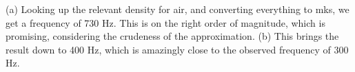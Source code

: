 (a) Looking up the relevant density for air, and converting everything to mks,
we get a frequency of 730 Hz. This is on the right order of magnitude, which
is promising, considering the crudeness of the approximation.
(b) This brings the result down to 400 Hz, which is amazingly close to the
observed frequency of 300 Hz.
